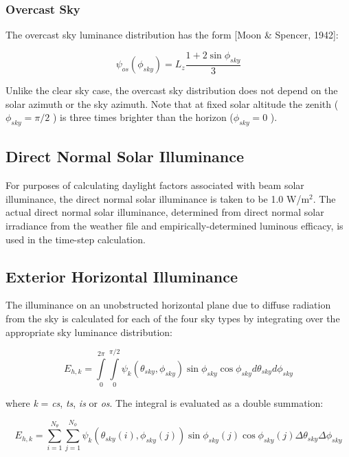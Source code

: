 \subsubsection{Overcast Sky}\label{overcast-sky}

The overcast sky luminance distribution has the form {[}Moon \& Spencer, 1942{]}:

\begin{equation}
{\psi_{os}}({\phi_{sky}}) = {L_z}\frac{{1 + 2\sin {\phi_{sky}}}}{3}
\end{equation}

Unlike the clear sky case, the overcast sky distribution does not depend on the solar azimuth or the sky azimuth. Note that at fixed solar altitude the zenith (\({\phi_{sky}} = \pi /2\) ) is three times brighter than the horizon (\({\phi_{sky}} = 0\) ).

\subsection{Direct Normal Solar Illuminance}\label{direct-normal-solar-illuminance}

For purposes of calculating daylight factors associated with beam solar illuminance, the direct normal solar illuminance is taken to be 1.0 W/m\(^{2}\). The actual direct normal solar illuminance, determined from direct normal solar irradiance from the weather file and empirically-determined luminous efficacy, is used in the time-step calculation.

\subsection{Exterior Horizontal Illuminance}\label{exterior-horizontal-illuminance}

The illuminance on an unobstructed horizontal plane due to diffuse radiation from the sky is calculated for each of the four sky types by integrating over the appropriate sky luminance distribution:

\begin{equation}
{E_{h,k}} = \int\limits_0^{2\pi } {\int\limits_0^{\pi /2} {{\psi_k}({\theta_{sky}},{\phi_{sky}})\sin {\phi_{sky}}\cos {\phi_{sky}}d{\theta_{sky}}} } d{\phi_{sky}}
\end{equation}

where \emph{k} = \emph{cs}, \emph{ts}, \emph{is} or \emph{os}. The integral is evaluated as a double summation:

\begin{equation}
{E_{h,k}} = \sum\limits_{i = 1}^{{N_\theta }} {\sum\limits_{j = 1}^{{N_\phi }} {{\psi_k}\left( {{\theta_{sky}}(i),{\phi_{sky}}(j)} \right)} } \sin {\phi_{sky}}(j)\cos {\phi_{sky}}(j)\Delta {\theta_{sky}}\Delta {\phi_{sky}}
\end{equation}

